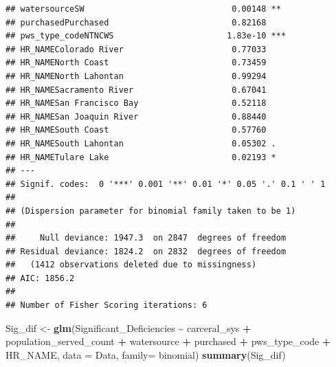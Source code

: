 \documentclass[
]{article}
\newenvironment{Shaded}{\begin{snugshade}}{\end{snugshade}}
\newcommand{\AttributeTok}[1]{\textcolor[rgb]{0.13,0.29,0.53}{#1}}
\newcommand{\FunctionTok}[1]{\textcolor[rgb]{0.13,0.29,0.53}{\textbf{#1}}}
\newcommand{\NormalTok}[1]{#1}
\newcommand{\OtherTok}[1]{\textcolor[rgb]{0.56,0.35,0.01}{#1}}
\newcommand{\SpecialCharTok}[1]{\textcolor[rgb]{0.81,0.36,0.00}{\textbf{#1}}}
\begin{document}
\begin{verbatim}
## watersourceSW                              0.00148 ** 
## purchasedPurchased                         0.82168    
## pws_type_codeNTNCWS                       1.83e-10 ***
## HR_NAMEColorado River                      0.77033    
## HR_NAMENorth Coast                         0.73459    
## HR_NAMENorth Lahontan                      0.99294    
## HR_NAMESacramento River                    0.67041    
## HR_NAMESan Francisco Bay                   0.52118    
## HR_NAMESan Joaquin River                   0.88440    
## HR_NAMESouth Coast                         0.57760    
## HR_NAMESouth Lahontan                      0.05302 .  
## HR_NAMETulare Lake                         0.02193 *  
## ---
## Signif. codes:  0 '***' 0.001 '**' 0.01 '*' 0.05 '.' 0.1 ' ' 1
## 
## (Dispersion parameter for binomial family taken to be 1)
## 
##     Null deviance: 1947.3  on 2847  degrees of freedom
## Residual deviance: 1824.2  on 2832  degrees of freedom
##   (1412 observations deleted due to missingness)
## AIC: 1856.2
## 
## Number of Fisher Scoring iterations: 6
\end{verbatim}

\begin{Shaded}
\begin{Highlighting}[]
\NormalTok{Sig\_dif }\OtherTok{\textless{}{-}} \FunctionTok{glm}\NormalTok{(Significant\_Deficiencies }\SpecialCharTok{\textasciitilde{}}\NormalTok{ carceral\_sys }\SpecialCharTok{+}\NormalTok{ population\_served\_count }\SpecialCharTok{+}\NormalTok{ watersource }\SpecialCharTok{+}\NormalTok{ purchased }\SpecialCharTok{+}\NormalTok{ pws\_type\_code }\SpecialCharTok{+}\NormalTok{ HR\_NAME, }\AttributeTok{data =}\NormalTok{ Data, }\AttributeTok{family=}\NormalTok{ binomial)}
\FunctionTok{summary}\NormalTok{(Sig\_dif)}
\end{Highlighting}
\end{Shaded}
\end{document}
